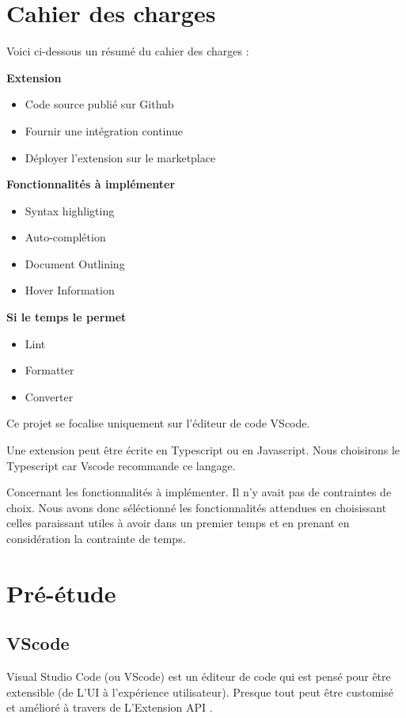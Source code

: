 \documentclass[
    iict, %
    il, %
]{heig-tb}
\begin{document}
\let\cleardoublepage\clearpage

\chapter{Cahier des charges}
Voici ci-dessous un résumé du cahier des charges :

\textbf{Extension}
\begin{itemize}
    \item Code source publié sur Github
    \item Fournir une intégration continue
    \item Déployer l'extension sur le marketplace
\end{itemize}

\textbf{Fonctionnalités à implémenter}
\begin{itemize}
    \item Syntax highligting
    \item Auto-complétion
    \item Document Outlining
    \item Hover Information
\end{itemize}

\textbf{Si le temps le permet}
\begin{itemize}
    \item Lint
    \item Formatter
    \item Converter
\end{itemize}

\vspace{\parskip}

Ce projet se focalise uniquement sur l'éditeur de code VScode.

Une extension peut être écrite en Typescript ou en Javascript.
Nous choisirons le Typescript car Vscode recommande ce langage.

Concernant les fonctionnalités à implémenter. Il n'y avait pas de contraintes de choix.
Nous avons donc séléctionné les fonctionnalités attendues en choisissant celles paraissant utiles à avoir dans un premier temps et en prenant en considération la contrainte de temps.

\chapter{Pré-étude}

\section{VScode}
Visual Studio Code (ou VScode) est un éditeur de code qui est pensé pour être extensible (de L'UI à l'expérience utilisateur).
Presque tout peut être customisé et amélioré à travers de L'Extension API \cite{extension-api}.
\end{document}
